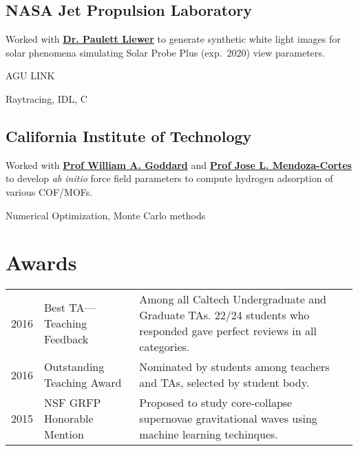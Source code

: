 \documentclass[]{deedy-resume-openfont}
\begin{document}
\begin{minipage}[t]{0.66\textwidth}
\subsection{NASA Jet Propulsion Laboratory}
\begin{tightemize}
    \item Worked with \textbf{\href{TODO}{Dr. Paulett Liewer}} to generate
        synthetic white light images for solar phenomena simulating Solar Probe
        Plus (exp.~2020) view parameters.
    \item AGU LINK %
    \item Raytracing, IDL, C
\end{tightemize}
\sectionsep

\subsection{California Institute of Technology}
\begin{tightemize}
    \item Worked with \textbf{\href{TODO}{Prof William A. Goddard}} and
        \textbf{\href{TODO}{Prof Jose L. Mendoza-Cortes}} to develop \emph{ab
        initio} force field parameters to compute hydrogen adsorption of various
        COF/MOFs.
    \item Numerical Optimization, Monte Carlo methods
\end{tightemize}
\sectionsep


\section{Awards}
\begin{tabular}{p{20pt}p{80pt}p{7.5cm}}
    2016 & Best TA---Teaching Feedback & Among all Caltech Undergraduate and
    Graduate TAs. 22/24 students who responded gave perfect reviews in all
    categories.\\
    2016 & Outstanding Teaching Award & Nominated by students among teachers and
    TAs, selected by student body.\\
    2015 & NSF GRFP Honorable Mention & Proposed to study core-collapse
    supernovae gravitational waves using machine learning techinques.
\end{tabular}
\sectionsep

\end{minipage}
\end{document}
